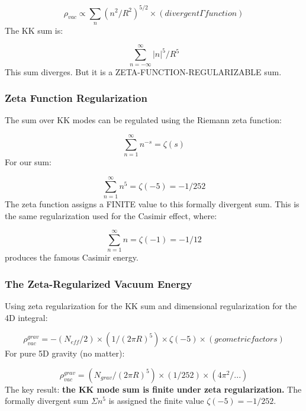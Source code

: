 \documentclass[aps,prd,preprint,superscriptaddress,longbibliography,floatfix]{revtex4-2}
\theoremstyle{remark}
\begin{document}
\begin{equation}
    \rho_{vac} \propto \sum_n (n^{2}/R^{2})^{5/2} \times (divergent \Gamma function)
\end{equation}
The KK sum is:


\begin{equation}
    \sum_{n=-\infty}^{\infty} |n|^{5} / R^{5}
\end{equation}
This sum diverges. But it is a ZETA-FUNCTION-REGULARIZABLE sum.


\subsubsection{Zeta Function Regularization}

The sum over KK modes can be regulated using the Riemann zeta function:


\begin{equation}
    \sum_{n=1}^{\infty} n^{-s} = \zeta(s)
\end{equation}
For our sum:


\begin{equation}
    \sum_{n=1}^{\infty} n^{5} = \zeta(-5) = -1/252
\end{equation}
The zeta function assigns a FINITE value to this formally divergent sum. This is the same regularization used for the Casimir effect, where:


\begin{equation}
    \sum_{n=1}^{\infty} n = \zeta(-1) = -1/12
\end{equation}
produces the famous Casimir energy.


\subsubsection{The Zeta-Regularized Vacuum Energy}

Using zeta regularization for the KK sum and dimensional regularization for the 4D integral:


\begin{equation}
    \rho_{vac}^{grav} = -(N_{eff} / 2) \times (1/(2\pi R)^{5}) \times \zeta(-5) \times (geometric factors)
\end{equation}
For pure 5D gravity (no matter):


\begin{equation}
    \rho_{vac}^{grav} = (N_{grav} / (2\pi R)^{5}) \times (1/252) \times (4\pi^{2}/...)
\end{equation}
The key result: \textbf{the KK mode sum is finite under zeta regularization.} The formally divergent sum $\Sigma n^{5}$ is assigned the finite value $\zeta(-5) = -1/252$.
\end{document}
